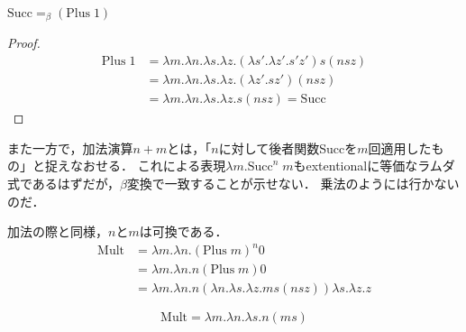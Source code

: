 \documentclass[uplatex, 12pt, dvipdfmx]{jsreport}
\begin{document}
\begin{proposition}
    $\mathrm{Succ}=_\beta(\mathrm{Plus}\;1)$
\end{proposition}
\begin{proof}
    \begin{align*}
        \mathrm{Plus}\; 1 &= \lambda m.\lambda n.\lambda s.\lambda z.(\lambda s'.\lambda z'.s'z')s(nsz) \\
        &= \lambda m.\lambda n.\lambda s.\lambda z.(\lambda z'.sz')(nsz) \\
        &= \lambda m.\lambda n.\lambda s.\lambda z.s(nsz) = \mathrm{Succ}
    \end{align*}
\end{proof}
\begin{remark}[謎]
    また一方で，加法演算$n+m$とは，「$n$に対して後者関数Succを$m$回適用したもの」と捉えなおせる．
    これによる表現$\lambda m.\mathrm{Succ}^n\; m$もextentionalに等価なラムダ式であるはずだが，$\beta$変換で一致することが示せない．
    乗法のようには行かないのだ．
\end{remark}

\begin{definition}[乗法]
    加法の際と同様，$n$と$m$は可換である．
    \begin{align*}
        \mathrm{Mult} &= \lambda m.\lambda n.(\mathrm{Plus}\; m)^n 0 \\
        &= \lambda m.\lambda n.n(\mathrm{Plus}\; m) 0 \\
        &= \lambda m.\lambda n.n(\lambda n.\lambda s.\lambda z.ms(nsz)) \lambda s.\lambda z.z
    \end{align*}
\end{definition}
\begin{proposition}[乗法の別表現]
    \[ \mathrm{Mult} = \lambda m.\lambda n.\lambda s.n(ms) \]
\end{proposition}
\end{document}

